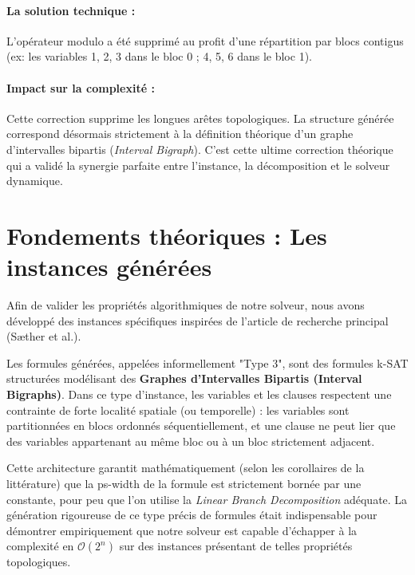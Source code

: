 \documentclass[11pt,a4paper]{report}
\begin{document}
\paragraph{La solution technique :}
L'opérateur modulo a été supprimé au profit d'une répartition par blocs contigus (ex: les variables 1, 2, 3 dans le bloc 0 ; 4, 5, 6 dans le bloc 1). 

\paragraph{Impact sur la complexité :}
Cette correction supprime les longues arêtes topologiques. La structure générée correspond désormais strictement à la définition théorique d'un graphe d'intervalles bipartis (\textit{Interval Bigraph}). C'est cette ultime correction théorique qui a validé la synergie parfaite entre l'instance, la décomposition et le solveur dynamique.

\section*{Fondements théoriques : Les instances générées}

Afin de valider les propriétés algorithmiques de notre solveur, nous avons développé des instances spécifiques inspirées de l'article de recherche principal (Sæther et al.). 

Les formules générées, appelées informellement "Type 3", sont des formules k-SAT structurées modélisant des \textbf{Graphes d'Intervalles Bipartis (Interval Bigraphs)}. Dans ce type d'instance, les variables et les clauses respectent une contrainte de forte localité spatiale (ou temporelle) : les variables sont partitionnées en blocs ordonnés séquentiellement, et une clause ne peut lier que des variables appartenant au même bloc ou à un bloc strictement adjacent. 

Cette architecture garantit mathématiquement (selon les corollaires de la littérature) que la ps-width de la formule est strictement bornée par une constante, pour peu que l'on utilise la \textit{Linear Branch Decomposition} adéquate. La génération rigoureuse de ce type précis de formules était indispensable pour démontrer empiriquement que notre solveur est capable d'échapper à la complexité en $\mathcal{O}(2^n)$ sur des instances présentant de telles propriétés topologiques.

\end{document}

